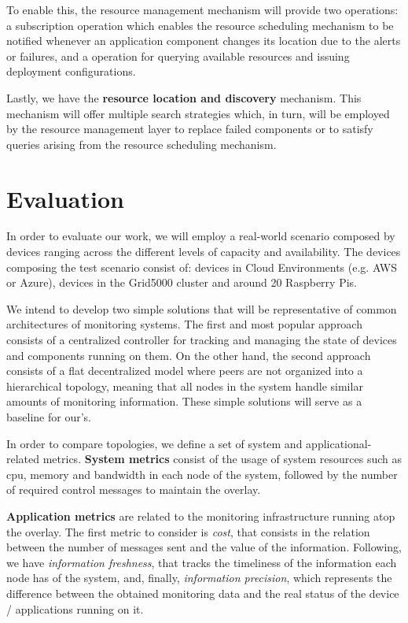 To enable this, the resource management mechanism will provide two operations: a subscription operation which enables the resource scheduling mechanism to be notified whenever an application component changes its location due to the alerts or failures, and a operation for querying available resources and issuing deployment configurations. 

Lastly, we have the \textbf{resource location and discovery} mechanism. This mechanism will offer multiple search strategies which, in turn, will be employed by the resource management layer to replace failed components or to satisfy queries arising from the resource scheduling mechanism.

\section{Evaluation}  

In order to evaluate our work, we will employ a real-world scenario composed by devices ranging across the different levels of capacity and availability. The devices composing the test scenario consist of: devices in Cloud Environments (e.g. AWS or Azure), devices in the Grid5000 cluster and around 20 Raspberry Pis.

We intend to develop two simple solutions 
that will be representative of common architectures of monitoring systems. The first and most popular approach consists of a centralized controller for tracking and managing the state of devices and components running on them. %
On the other hand, the second approach consists of a flat decentralized model where peers are not organized into a hierarchical topology, 
meaning that all nodes in the system handle similar amounts of monitoring information. These simple solutions will serve as a baseline for our's.

In order to compare topologies, we define a set of system and applicational-related metrics. \textbf{System metrics} consist of the usage of system resources such as cpu, memory and bandwidth in each node of the system, followed by the number of required control messages to maintain the overlay.

\textbf{Application metrics} are related to the monitoring infrastructure running atop the overlay. The first metric to consider is \textit{cost}, that consists in the relation between the number of messages sent and the value of the information. 
Following, we have \textit{information freshness}, that tracks the timeliness of the information each node has of the system, and, finally, \textit{information precision}, which represents the difference between the obtained monitoring data and the real status of the device / applications running on it. 


